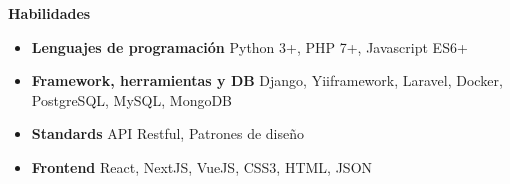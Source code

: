 \documentclass[letterpaper,12pt]{article}[leftmargin=*]
\makeatletter
\def \entryspacing {-0pt}
\renewcommand{\section}[2]{\vspace{5pt}
  \colorbox{secondary}{\color{white}\raggedbottom\normalsize\textbf{{#1}{\hspace{7pt}#2}}}
}
\newcommand{\resumeEntryStart}{\begin{itemize}[leftmargin=2.5mm]}
\newcommand{\resumeEntryEnd}{\end{itemize}\vspace{\entryspacing}}
\newcommand{\resumeItemListStart}{\begin{itemize}[leftmargin=4.5mm]}
\newcommand{\resumeItemListEnd}{\end{itemize}}
\newcommand{\resumeItem}[1]{
  \item\small{
    {#1 \vspace{-2pt}}
  }
}
\newcommand{\resumeEntryTD}[2]{
  \vspace{-1pt}\item[]
    \begin{tabularx}{0.97\textwidth}{X@{\hspace{60pt}}r}
      \textbf{\color{primary}#1} & {\firabook\color{accent}\small#2} \\
    \end{tabularx}\vspace{-6pt}
}
\newcommand{\resumeEntryS}[2]{
  \item[]\small{
    \textbf{\color{primary}#1 }{ #2 \vspace{-6pt}}
  }
}
\makeatother
\begin{document}



\section{\faGears}{Habilidades}
 \resumeEntryStart
  \resumeEntryS{Lenguajes de programación} {Python 3+, PHP 7+, Javascript ES6+ }
  \resumeEntryS{Framework, herramientas y DB} {Django, Yiiframework, Laravel, Docker, PostgreSQL, MySQL, MongoDB}
  \resumeEntryS{Standards } {API Restful, Patrones de diseño}
  \resumeEntryS{Frontend } {React, NextJS, VueJS, CSS3, HTML, JSON}
 \resumeEntryEnd
\end{document}
